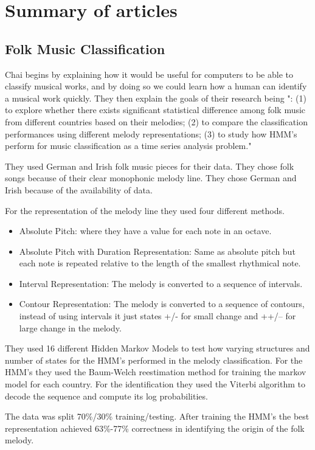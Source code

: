 \documentclass{article}
\begin{document}
	\section{Summary of articles}
	\subsection{Folk Music Classification}
	
	Chai begins by explaining how it would be useful for computers to be able to classify 
	musical works, and by doing so we could learn how a human can identify a musical work quickly. They then explain the goals of their research being ": (1) to explore whether there exists
	significant statistical difference among folk music
	from different countries based on their melodies;
	(2) to compare the classification performances
	using different melody representations; (3) to
	study how HMM’s perform for music
	classification as a time series analysis problem."

	
	They used German and Irish folk music pieces for their data. They chose folk songs because of their clear monophonic melody line. They chose German and Irish because 
	of the availability of data.
	
	For the representation of the melody line they used four different methods.
	\begin{itemize}
		\item Absolute Pitch: where they have a value for each note in an octave. 
		\item Absolute Pitch with Duration Representation: Same as absolute pitch but each note is repeated relative to the length of the smallest rhythmical note.
		\item Interval Representation: The melody is converted to a sequence of intervals. 
		\item Contour Representation: The melody is converted to a sequence of contours, instead of using intervals it just states +/- for small change and ++/-- for large change in the melody.
	\end{itemize}
	
	They used 16 different Hidden Markov Models to test how varying structures and number of states for the HMM's performed in the melody classification. For the HMM's they used the Baum-Welch reestimation method for training the markov model for each country. For the identification they used the Viterbi algorithm to decode the sequence and compute its log probabilities. 
	
	The data was split 70\%/30\% training/testing. After training the HMM's the best representation achieved 63\%-77\% correctness in identifying the origin of the folk melody. 
	
\end{document}
